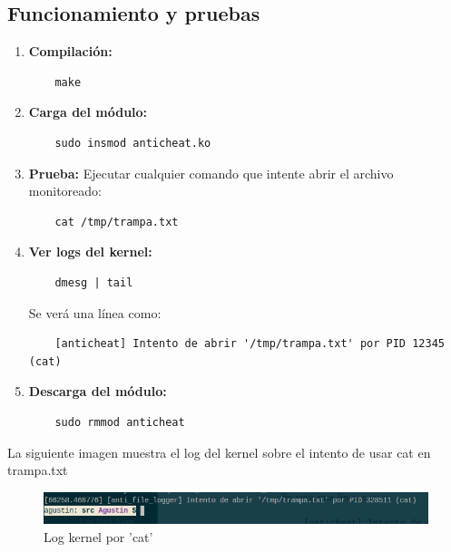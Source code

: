 \subsection{Funcionamiento y pruebas}

\begin{enumerate}
    \item \textbf{Compilación:} 
    \begin{verbatim}
    make
    \end{verbatim}
    \item \textbf{Carga del módulo:}
    \begin{verbatim}
    sudo insmod anticheat.ko
    \end{verbatim}
    \item \textbf{Prueba:} 
    Ejecutar cualquier comando que intente abrir el archivo monitoreado:
    \begin{verbatim}
    cat /tmp/trampa.txt
    \end{verbatim}
    \item \textbf{Ver logs del kernel:}
    \begin{verbatim}
    dmesg | tail
    \end{verbatim}
    Se verá una línea como:
    \begin{verbatim}
    [anticheat] Intento de abrir '/tmp/trampa.txt' por PID 12345 (cat)
    \end{verbatim}
    \item \textbf{Descarga del módulo:}
    \begin{verbatim}
    sudo rmmod anticheat
    \end{verbatim}
\end{enumerate}
\newpage
La siguiente imagen muestra el log del kernel sobre el intento de usar cat en trampa.txt

\begin{figure}[h!]
  \centering
  \includegraphics[width=0.8\linewidth]{images/dmesg.png}
  \caption{Log kernel por 'cat'}
\end{figure}

